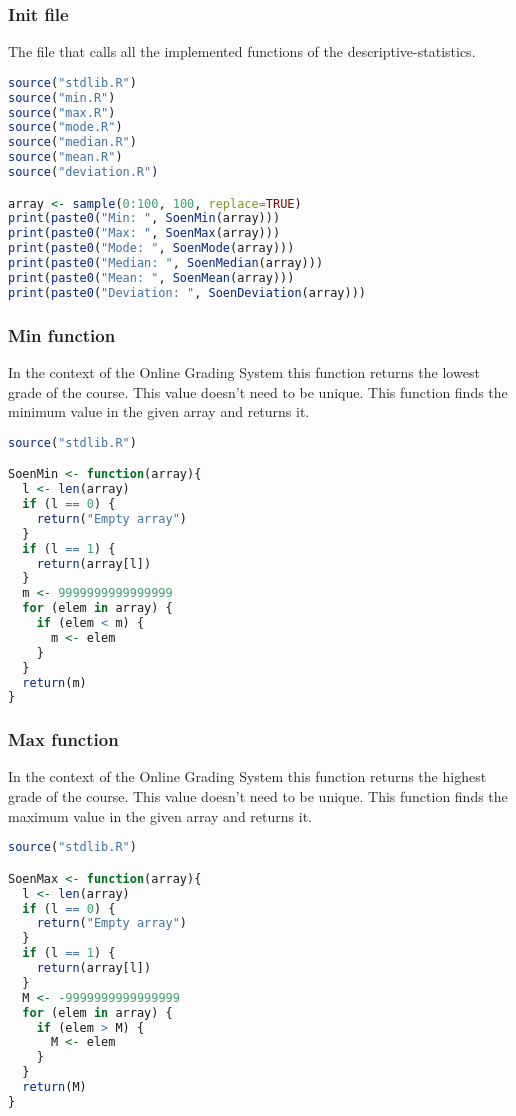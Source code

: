\documentclass[12pt]{article}
\begin{document}
\subsubsection{Init file}
The file that calls all the implemented functions of the descriptive-statistics.
\begin{lstlisting}[language=R]
source("stdlib.R")
source("min.R")
source("max.R")
source("mode.R")
source("median.R")
source("mean.R")
source("deviation.R")

array <- sample(0:100, 100, replace=TRUE)
print(paste0("Min: ", SoenMin(array)))
print(paste0("Max: ", SoenMax(array)))
print(paste0("Mode: ", SoenMode(array)))
print(paste0("Median: ", SoenMedian(array)))
print(paste0("Mean: ", SoenMean(array)))
print(paste0("Deviation: ", SoenDeviation(array)))
\end{lstlisting}
\subsubsection{Min function}
In the context of the Online Grading System this function returns the lowest grade of the course. This value doesn't need to be unique. This function finds the minimum value in the given array and returns it.
\begin{lstlisting}[language=R]
source("stdlib.R")

SoenMin <- function(array){
  l <- len(array)
  if (l == 0) {
    return("Empty array")
  }
  if (l == 1) {
    return(array[l])
  }
  m <- 9999999999999999
  for (elem in array) {
    if (elem < m) {
      m <- elem
    }
  }
  return(m)
}
\end{lstlisting}
\subsubsection{Max function}
In the context of the Online Grading System this function returns the highest grade of the course. This value doesn't need to be unique. This function finds the maximum value in the given array and returns it.
\begin{lstlisting}[language=R]
source("stdlib.R")

SoenMax <- function(array){
  l <- len(array)
  if (l == 0) {
    return("Empty array")
  }
  if (l == 1) {
    return(array[l])
  }
  M <- -9999999999999999
  for (elem in array) {
    if (elem > M) {
      M <- elem
    }
  }
  return(M)
}
\end{lstlisting}
\end{document}
